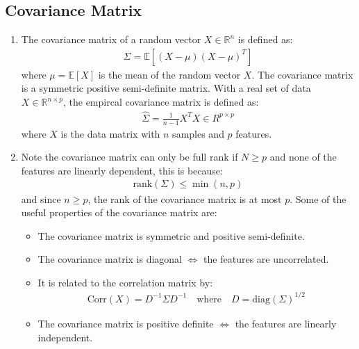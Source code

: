 \documentclass[letterpaper, 11pt]{article}
\newcommand{\R}{\mathbb{R}}	%
\newcommand{\E}{\mathbb{E}}	%
\newcommand{\1}{\mathds{1}}	%
\theoremstyle{definition}
\begin{document}
\subsection{Covariance Matrix}
\begin{enumerate}
    \item The covariance matrix of a random vector $X \in \R^n$ is defined as:
    \begin{align}
        \Sigma = \E[(X - \mu)(X - \mu)^T]
    \end{align}
    where $\mu = \E[X]$ is the mean of the random vector $X$. The covariance matrix is a symmetric positive semi-definite matrix. 
    With a real set of data $X \in \R^{n \times p}$, the empircal covariance matrix is defined as:
    \begin{align}
        \hat{\Sigma} = \frac{1}{n - 1} X^T X \in R^{p \times p}
    \end{align}
    where $X$ is the data matrix with $n$ samples and $p$ features.
    \item Note the covariance matrix can only be full rank if $N \ge p$ and none of the features 
    are linearly dependent, this is because:
    \begin{align}
        \text{rank}(\Sigma) \le \min(n,p)
    \end{align}
    and since $n \ge p$, the rank of the covariance matrix is at most $p$. Some of the 
    useful properties of the covariance matrix are:
    \begin{itemize}
        \item The covariance matrix is symmetric and positive semi-definite.
        \item The covariance matrix is diagonal $\iff$ the features are uncorrelated.
        \item It is related to the correlation matrix by:
        \begin{align}
            \text{Corr}(X) = D^{-1} \Sigma D^{-1} \quad \text{where} \quad D = \text{diag}(\Sigma)^{1/2}
        \end{align}
        \item The covariance matrix is positive definite $\iff$ the features are linearly independent.
    \end{itemize}    
\end{enumerate}
\end{document}
